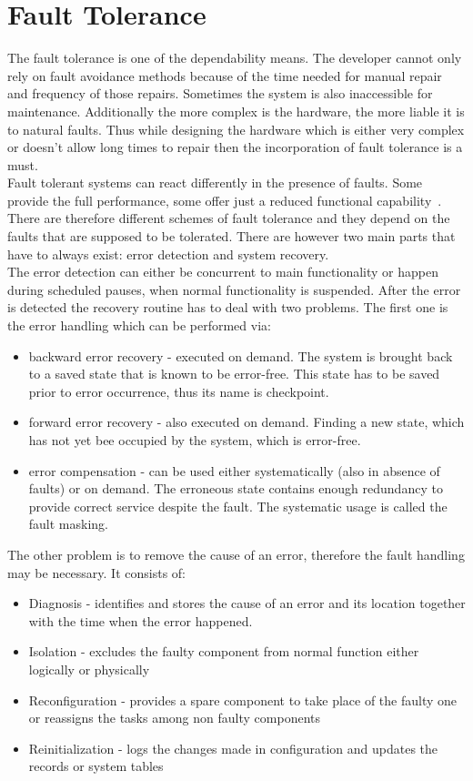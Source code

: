 \section{Fault Tolerance}
The fault tolerance is one of the dependability means. The developer cannot only rely on fault avoidance methods because of the time needed for manual repair and frequency of those repairs. Sometimes the system is also inaccessible for maintenance. Additionally the more complex is the hardware, the more liable it is to natural faults. Thus while designing the hardware which is either very complex or doesn't allow long times to repair then the incorporation of fault tolerance is a must.\\
Fault tolerant systems can react differently in the presence of faults. Some provide the full performance, some offer just a reduced functional capability~\cite{art:Randell}. There are therefore different schemes of fault tolerance and they depend on the faults that are supposed to be tolerated. There are however two main parts that have to always exist: error detection and system recovery.\\
The error detection can either be concurrent to main functionality or happen during scheduled pauses, when normal functionality is suspended. After the error is detected the recovery routine has to deal with two problems. The first one is the error handling which can be performed via:
\begin{itemize}
    \item backward error recovery - executed on demand. The system is brought back to a saved state that is known to be error-free. This state has to be saved prior to error occurrence, thus its name is checkpoint.
    \item forward error recovery - also executed on demand. Finding a new state, which has not yet bee occupied by the system, which is error-free.
    \item error compensation - can be used either systematically (also in absence of faults) or on demand. The erroneous state contains enough redundancy to provide correct service despite the fault. The systematic usage is called the fault masking.
\end{itemize} 
The other problem is to remove the cause of an error, therefore the fault handling may be necessary. It consists of:
\begin{itemize}
    \item Diagnosis - identifies and stores the cause of an error and its location together with the time when the error happened.
    \item Isolation - excludes the faulty component from normal function either logically or physically 
    \item Reconfiguration - provides a spare component to take place of the faulty one or reassigns the tasks among non faulty components
    \item Reinitialization - logs the changes made in configuration and updates the records or system tables 
\end{itemize}
